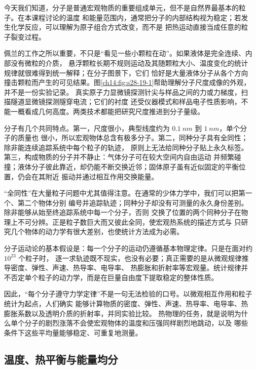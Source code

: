 \molecularMicroscopyFigure

今天我们知道，分子是普通宏观物质的重要组成单元，但不是自然界最基本的粒子。在本课程讨论的温度
和能量范围内，通常把分子的内部结构视为稳定；若发生化学反应，可以理解为原子组合方式改变，而不是
把热运动直接当成任意的粒子裂变过程。

佩兰的工作之所以重要，不只是“看见一些小颗粒在动”。如果液体是完全连续、内部没有微粒的介质，
悬浮颗粒长期不规则运动及其随颗粒大小、温度变化的统计规律就很难得到统一解释；在分子图景下，它们
恰好是大量液体分子从各个方向撞击颗粒而产生的可见结果。图\ref{ch14:fig:s28-19-1}帮助理解分子尺度成像的外观，并不是一份实验记录。
真实原子力显微镜探测针尖与样品之间的力或力梯度，扫描隧道显微镜探测隧穿电流；它们的衬度
还受仪器模式和样品电子性质影响，不能一概看成几何高度。两类技术都能把研究尺度推进到分子量级。

分子有几个共同特点。第一，尺度很小，典型线度约为 $\SI{0.1}{nm}$ 到 $\SI{1}{nm}$，单个分子的质量也
很小，所以宏观物体总含有极多分子。第二，同种分子具有全同性；除非能连续追踪系统中每个粒子的轨迹，
原则上无法给同种分子贴上永久标签。第三，构成物质的分子并不静止：气体分子可在较大空间内自由运动
并频繁碰撞；液体分子彼此靠近，却仍能不断交换近邻；固体原子虽有近似固定的平衡位置，仍会在其附近
振动并通过相互作用交换能量。

“全同性”在大量粒子问题中尤其值得注意。在通常的少体力学中，我们可以把第一个、第二个物体分别
编号并追踪轨迹；同种分子却没有可测量的永久身份差别。除非能够从始至终追踪系统中每一个分子，否则
交换了位置的两个同种分子在物理上不可分辨。正是粒子数巨大而又彼此全同，使宏观热系统的描述方式与
只研究几个物体的动力学有很大差别，也使统计方法成为必需。

分子运动论的基本假设是：每一个分子的运动仍遵循基本物理定律。只是在面对约 $10^{23}$ 个粒子时，
逐一求轨迹既不现实，也没有必要；真正需要的是从微观规律推导密度、弹性、声速、热导率、电导率、
热膨胀和折射率等宏观量。统计规律并不否定单个粒子的动力学，而是在巨量自由度下提取稳定的整体性质。

因此，“每个分子遵守力学定律”不是一句无法检验的口号。以微观相互作用和粒子统计为起点，人们确实
能够计算物质的密度、弹性、声速、热导率、电导率、热膨胀系数以及透明介质的折射率，并同实验比较。
热物理的任务，就是说明为什么单个分子的剧烈涨落不会使宏观物体的温度和压强同样剧烈地跳动，以及
哪些条件下这些平均量能够稳定、可重复地测量。

\subsection{温度、热平衡与能量均分}\label{ch14:sec:temperature}

